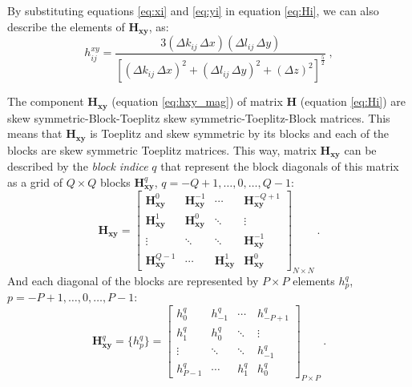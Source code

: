 By substituting equations \ref{eq:xi} and \ref{eq:yi} in equation \ref{eq:Hi}, we can also describe the elements of $\mathbf{H_{xy}}$, as:
\begin{equation}
	h^{xy}_{ij} = \frac{3 (\Delta k_{ij} \, \Delta x )(\Delta l_{ij} \, \Delta y )}{\left[ 
		\left( \Delta k_{ij} \, \Delta x \right)^{2} + 
		\left( \Delta l_{ij} \, \Delta y \right)^{2} + 
		\left( \Delta z \right)^{2} \right]^{\frac{5}{2}}} \: ,
	\label{eq:hxy_mag}
\end{equation}

The component $\mathbf{H_{xy}}$ (equation \ref{eq:hxy_mag}) of matrix $\mathbf{H}$ (equation \ref{eq:Hi}) are skew symmetric-Block-Toeplitz skew symmetric-Toeplitz-Block matrices. This means that $\mathbf{H_{xy}}$ is Toeplitz and skew symmetric by its blocks and each of the blocks are skew symmetric Toeplitz matrices. 
This way, matrix $\mathbf{H_{xy}}$ can be described by the \textit{block indice} $q$ that represent the block diagonals of this matrix as a grid of $Q \times Q$ blocks $\mathbf{H}^{q}_\mathbf{xy}$, $q = -Q + 1, \dots, 0, \dots, Q - 1$:
\begin{equation}
	\mathbf{H_{xy}} = \begin{bmatrix}
		\mathbf{H}^{0}_\mathbf{xy}  & \mathbf{H}^{-1}_\mathbf{xy} & \cdots         & \mathbf{H}^{-Q+1}_\mathbf{xy} \\
		\mathbf{H}^{1}_\mathbf{xy}  & \mathbf{H}^{0}_\mathbf{xy} & \ddots         & \vdots           \\ 
		\vdots           & \ddots         & \ddots         & \mathbf{H}^{-1}_\mathbf{xy}   \\
		\mathbf{H}^{Q-1}_\mathbf{xy} & \cdots         & \mathbf{H}^{1}_\mathbf{xy} & \mathbf{H}^{0}_\mathbf{xy}                
	\end{bmatrix}_{N \times N} \: .
	\label{eq:BTTB_Hxy}
\end{equation}
And each diagonal of the blocks are represented by $P \times P$ elements $h^{q}_{p}$, $p = -P + 1, \dots, 0, \dots, P - 1$:
\begin{equation}
	\mathbf{H}^{q}_\mathbf{xy} =  \{h^{q}_p\} = \begin{bmatrix}
		h^{q}_{0}   & h^{q}_{-1} & \cdots    & h^{q}_{-P+1} \\
		h^{q}_{1}   & h^{q}_{0} & \ddots    & \vdots           \\ 
		\vdots      & \ddots    & \ddots    & h^{q}_{-1}   \\
		h^{q}_{P-1} & \cdots    & h^{q}_{1} & h^{q}_{0}                 
	\end{bmatrix}_{P \times P} \: .
	\label{eq:Hxy_block}
\end{equation}
